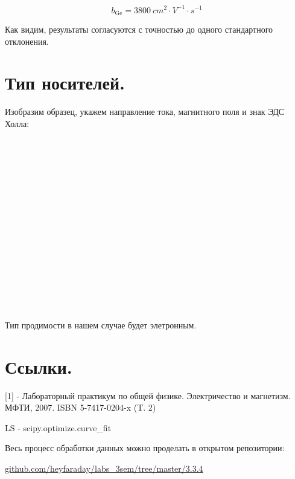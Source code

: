 $$\boxed{b_{\text{Ge}} = 3800~cm^2 \cdot V^{-1} \cdot s^{-1}}$$

Как видим, результаты согласуются с точностью до одного стандартного отклонения.

\newpage
\section{\label{sec:level1}Тип носителей.}

Изобразим образец, укажем направление тока, магнитного поля и знак ЭДС Холла:
\\
\\
\\
\\
\\
\\
\\
\\
\\
\\
\\
\\
\\
\\
\\
\\
\\

Тип продимости в нашем случае будет элетронным. 

\section{\label{sec:level1}Ссылки.}
[1] - Лабораторный практикум по общей физике. Электричество и магнетизм. МФТИ, 2007. ISBN 5-7417-0204-x (T. 2)

LS - scipy.optimize.curve\_fit

Весь процесс обработки данных можно проделать в открытом репозитории:

\href{github.com/heyfaraday/labs_3sem/tree/master/3.1.2}{github.com/heyfaraday/labs\_3sem/tree/master/3.3.4}


